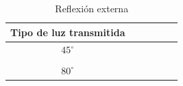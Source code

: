 \documentclass[11pt]{article}
\begin{document}
\begin{table}[ht]
{\begin{tabular}{|cccccc|}
                  \textbf{Tipo de luz transmitida} \\ \hline
                \multicolumn{1}{|c|}{\cellcolor[HTML]{FFFFFF}$45^\circ$} &
                  \multicolumn{1}{c|}{} &
                  \multicolumn{1}{c|}{} &
                  \multicolumn{1}{c|}{} &
                  \multicolumn{1}{c|}{} &
                   \\
                \rowcolor[HTML]{EFEFEF} 
                \multicolumn{1}{|c|}{\cellcolor[HTML]{EFEFEF}$59.5^\circ$} &
                  \multicolumn{1}{c|}{\cellcolor[HTML]{EFEFEF}} &
                  \multicolumn{1}{c|}{\cellcolor[HTML]{EFEFEF}} &
                  \multicolumn{1}{c|}{\cellcolor[HTML]{EFEFEF}} &
                  \multicolumn{1}{c|}{\cellcolor[HTML]{EFEFEF}} &
                   \\
                \multicolumn{1}{|c|}{\cellcolor[HTML]{FFFFFF}$80^\circ$} &
                  \multicolumn{1}{c|}{} &
                  \multicolumn{1}{c|}{} &
                  \multicolumn{1}{c|}{} &
                  \multicolumn{1}{c|}{} &
                   \\ \hline
            \end{tabular}%
            }
            \caption{Reflexión externa}
            \label{tab:reflexion_externa}
        \end{table}
        
\end{document}
